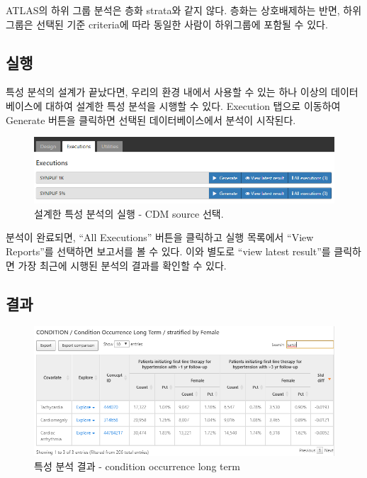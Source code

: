 \documentclass[10.5pt]{book}
\theoremstyle{definition}
\theoremstyle{definition}
\theoremstyle{definition}
\theoremstyle{remark}
\let\BeginKnitrBlock\begin \let\EndKnitrBlock\end
\begin{document}
\BeginKnitrBlock{rmdimportant}
ATLAS의 하위 그룹 분석은 층화 strata와 같지 않다. 층화는 상호배제하는
반면, 하위그룹은 선택된 기준 criteria에 따라 동일한 사람이 하위그룹에
포함될 수 있다.
\EndKnitrBlock{rmdimportant}

\subsection{실행}

특성 분석의 설계가 끝났다면, 우리의 환경 내에서 사용할 수 있는 하나
이상의 데이터베이스에 대하여 설계한 특성 분석을 시행할 수 있다.
Execution 탭으로 이동하여 Generate 버튼을 클릭하면 선택된
데이터베이스에서 분석이 시작된다.

\begin{figure}

{\centering \includegraphics[width=1\linewidth]{images/Characterization/atlasCharacterizationExecutions} 

}

\caption{설계한 특성 분석의 실행 - CDM source 선택.}\label{fig:atlasCharacterizationExecutions}
\end{figure}

분석이 완료되면, ``All Executions'' 버튼을 클릭하고 실행 목록에서 ``View
Reports''를 선택하면 보고서를 볼 수 있다. 이와 별도로 ``view latest
result''를 클릭하면 가장 최근에 시행된 분석의 결과를 확인할 수 있다.

\subsection{결과}\label{-1}

\begin{figure}

{\centering \includegraphics[width=1\linewidth]{images/Characterization/atlasCharacterizationResultsSummary} 

}

\caption{특성 분석 결과 - condition occurrence long term}\label{fig:atlasCharacterizationResultsSummary}
\end{figure}
\end{document}
